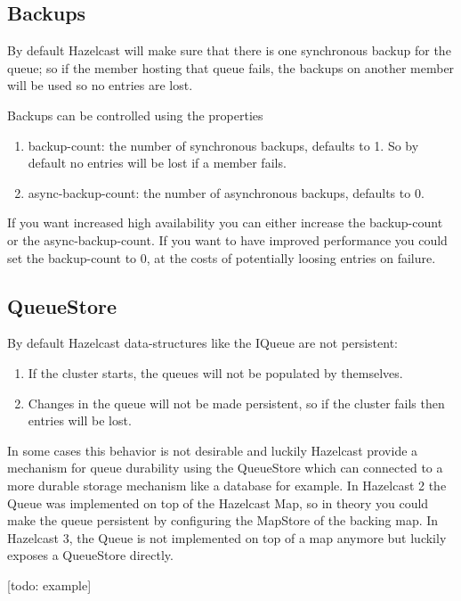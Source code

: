 \subsection{Backups}
By default Hazelcast will make sure that there is one synchronous backup for the queue; so if the member hosting that queue fails, the backups on another member will be used so no entries are lost.

Backups can be controlled using the properties
\begin{enumerate}
 \item backup-count: the number of synchronous backups, defaults to 1. So by default no entries will be lost if a member fails.
 \item async-backup-count: the number of asynchronous backups, defaults to 0.
\end{enumerate}
If you want increased high availability you can either increase the backup-count or the async-backup-count. If you want to have improved performance you could set the backup-count to 0, at the costs of potentially loosing entries on failure.

\subsection{QueueStore}
By default Hazelcast data-structures like the IQueue are not persistent:
\begin{enumerate}
 \item If the cluster starts, the queues will not be populated by themselves.
 \item Changes in the queue will not be made persistent, so if the cluster fails then entries will be lost.
\end{enumerate}
In some cases this behavior is not desirable and luckily Hazelcast provide a mechanism for queue durability using the QueueStore which can connected to a more durable storage mechanism like a database for example. In Hazelcast 2 the Queue was implemented on top of the Hazelcast Map, so in theory you could make the queue persistent by configuring the MapStore of the backing map. In Hazelcast 3, the Queue is not implemented on top of a map anymore but luckily exposes a QueueStore directly.

[todo: example]

